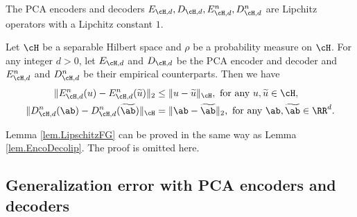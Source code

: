 \documentclass[11pt]{article} %
\begin{document}
The PCA encoders and decoders $E_{\cH,d},D_{\cH,d},E_{\cH,d}^n,D_{\cH,d}^n$ are Lipchitz operators with a Lipchitz constant $1$.
\begin{lemma}\label{lem.LipschitzFG}
	Let $\cH$ be a separable Hilbert space and $\rho$ be a probability measure on $\cH$. For any integer $d>0$, let $E_{\cH,d}$ and $D_{\cH,d}$ be the PCA encoder and decoder and $E_{\cH,d}^n$ and $D_{\cH,d}^n$ be their empirical counterparts. Then we have
	\begin{align*}
		 \|E_{\cH,d}^n(u)-E_{\cH,d}^n(\widetilde{u})\|_2 &\leq \|u-\widetilde{u}\|_{\cH},\ \text{for any } u,\widetilde{u}\in \cH,
	\\
		 \|D_{\cH,d}^n(\ab)-D_{\cH,d}^n(\widetilde{\ab})\|_{\cH} &= \|\ab-\widetilde{\ab}\|_2, \ \text{for any } \ab,\widetilde{\ab}\in \RR^d.
	\end{align*}
\end{lemma}
Lemma \ref{lem.LipschitzFG} can be proved in the same way as Lemma \ref{lem.EncoDecolip}. The proof is omitted here. %


\subsection{Generalization error with PCA encoders and decoders}
\end{document}
